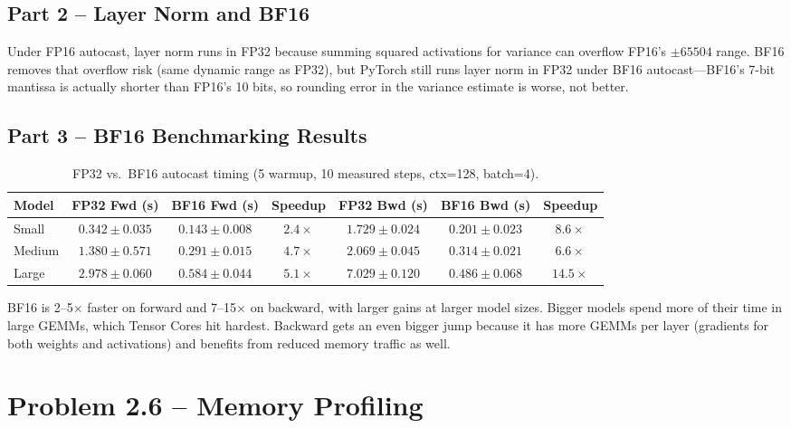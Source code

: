 \documentclass[11pt]{article}
\begin{document}
\subsection*{Part 2 -- Layer Norm and BF16}

Under FP16 autocast, layer norm runs in FP32 because summing squared activations for variance can overflow FP16's $\pm 65504$ range. BF16 removes that overflow risk (same dynamic range as FP32), but PyTorch still runs layer norm in FP32 under BF16 autocast---BF16's 7-bit mantissa is actually shorter than FP16's 10 bits, so rounding error in the variance estimate is worse, not better.

\subsection*{Part 3 -- BF16 Benchmarking Results}

\begin{table}[h]
\centering
\begin{tabular}{lcccccc}
\toprule
Model & FP32 Fwd (s) & BF16 Fwd (s) & Speedup & FP32 Bwd (s) & BF16 Bwd (s) & Speedup \\
\midrule
Small  & $0.342 \pm 0.035$ & $0.143 \pm 0.008$ & $2.4\times$ & $1.729 \pm 0.024$ & $0.201 \pm 0.023$ & $8.6\times$ \\
Medium & $1.380 \pm 0.571$ & $0.291 \pm 0.015$ & $4.7\times$ & $2.069 \pm 0.045$ & $0.314 \pm 0.021$ & $6.6\times$ \\
Large  & $2.978 \pm 0.060$ & $0.584 \pm 0.044$ & $5.1\times$ & $7.029 \pm 0.120$ & $0.486 \pm 0.068$ & $14.5\times$ \\
\bottomrule
\end{tabular}
\caption{FP32 vs.\ BF16 autocast timing (5 warmup, 10 measured steps, ctx=128, batch=4).}
\end{table}

BF16 is 2--5$\times$ faster on forward and 7--15$\times$ on backward, with larger gains at larger model sizes. Bigger models spend more of their time in large GEMMs, which Tensor Cores hit hardest. Backward gets an even bigger jump because it has more GEMMs per layer (gradients for both weights and activations) and benefits from reduced memory traffic as well.


\section{Problem 2.6 -- Memory Profiling}
\end{document}
